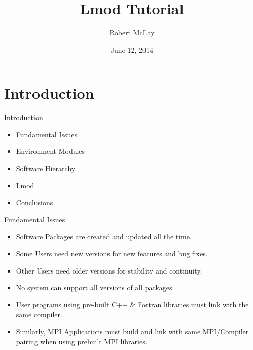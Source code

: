 \documentclass{beamer}
\title{Lmod Tutorial}
\author{Robert McLay}
\institute{The Texas Advanced Computing Center}
\date{June 12, 2014}  %
\begin{document}
\begin{frame}
  \titlepage
\end{frame}

\section{Introduction}

\begin{frame}{Introduction}
  \begin{itemize}
    \item Fundamental Issues
    \item Environment Modules
    \item Software Hierarchy
    \item Lmod
    \item Conclusions
  \end{itemize}
\end{frame}


\begin{frame}{Fundamental Issues}
  \begin{itemize}
    \item Software Packages are created and updated all the time.
    \item Some Users need new versions for new features and bug fixes.
    \item Other Users need older versions for stability and continuity.
    \item No system can support all versions of all packages.
    \item User programs using pre-built C++ \& Fortran libraries must
      link with the same compiler.
    \item Similarly, MPI Applications must build and link with same
      MPI/Compiler pairing when using prebuilt MPI libraries.
  \end{itemize}
\end{frame}
\end{document}

